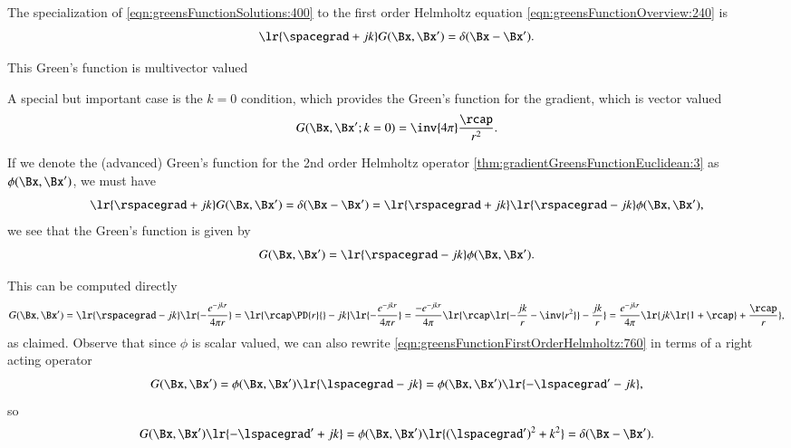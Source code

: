 %
%

The specialization of \cref{eqn:greensFunctionSolutions:400} to the first order Helmholtz equation \cref{eqn:greensFunctionOverview:240} is
\begin{dmath}\label{eqn:greensFunctionFirstOrderHelmholtz:700}
\lr{ \spacegrad + j k } G(\Bx, \Bx')  = \delta(\Bx - \Bx').
\end{dmath}

This Green's function is multivector valued



A special but important case is the \( k = 0 \) condition, which provides the
Green's function for the gradient, which is vector valued
\begin{equation}\label{eqn:greensFunctionFirstOrderHelmholtz:900}
G(\Bx, \Bx' ; k = 0) = \inv{4 \pi} \frac{\rcap}{r^2}.
\end{equation}

If we denote the (advanced) Green's function for the 2nd order Helmholtz operator
\cref{thm:gradientGreensFunctionEuclidean:3}
as \( \phi(\Bx, \Bx') \), we must have
\begin{equation}\label{eqn:greensFunctionFirstOrderHelmholtz:740}
\lr{ \rspacegrad + j k } G(\Bx, \Bx') = \delta(\Bx - \Bx') =
\lr{ \rspacegrad + j k } \lr{ \rspacegrad - j k } \phi(\Bx, \Bx'),
\end{equation}
we see that the Green's function is given by
\begin{dmath}\label{eqn:greensFunctionFirstOrderHelmholtz:760}
G(\Bx, \Bx')
=
\lr{ \rspacegrad - j k } \phi(\Bx, \Bx').
\end{dmath}

This can be computed directly
\begin{dmath}\label{eqn:greensFunctionFirstOrderHelmholtz:780}
G(\Bx, \Bx')
=
\lr{ \rspacegrad - j k } \lr{ -\frac{e^{-j k r}}{4 \pi r} }
=
\lr{ \rcap \PD{r}{} -j k } \lr{ -\frac{e^{-j k r}}{4 \pi r} }
=
\frac{-e^{-j k r}}{4 \pi}
\lr{
\rcap \lr{ -\frac{j k}{r} - \inv{ r^2 } } - \frac{j k}{r}
}
=
\frac{e^{-j k r}}{4 \pi}
\lr{
j k \lr{ 1 + \rcap } + \frac{\rcap}{r}
},
\end{dmath}
as claimed.
Observe that since \( \phi \) is scalar valued, we can also rewrite
\cref{eqn:greensFunctionFirstOrderHelmholtz:760} in terms of a right acting operator
\begin{dmath}\label{eqn:greensFunctionFirstOrderHelmholtz:800}
G(\Bx, \Bx')
=
\phi(\Bx, \Bx')
\lr{ \lspacegrad - j k }
=
\phi(\Bx, \Bx')
\lr{ -\lspacegrad' - j k },
\end{dmath}
so
\begin{equation}\label{eqn:greensFunctionFirstOrderHelmholtz:820}
G(\Bx, \Bx') \lr{ -\lspacegrad' + j k } =
\phi(\Bx, \Bx') \lr{ (\lspacegrad')^2 + k^2 }
=
\delta(\Bx - \Bx').
\end{equation}

